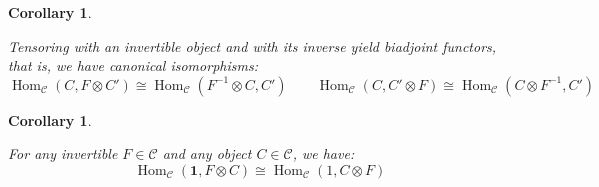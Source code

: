 \documentclass[12pt]{amsart}
\numberwithin{equation}{section}
\newtheorem{proposition}[theorem]{Proposition}
\newtheorem{corollary}[theorem]{Corollary}
\theoremstyle{definition}
\theoremstyle{remark}
\DeclareMathOperator{\Hom}{Hom}
\newcommand{\cat}{\mathcal{C}}
\renewcommand{\1}{\mathbf{1}}
\begin{document}
\begin{corollary}
\label{cor:inv 1}

Tensoring with an invertible object and with its inverse yield biadjoint functors, that is, we have canonical isomorphisms:
$$
\Hom_{\cat}(C, F \otimes C') \cong \Hom_{\cat}(F^{-1} \otimes C,C') \qquad \Hom_{\cat}(C, C' \otimes F) \cong \Hom_{\cat}(C \otimes F^{-1},C')
$$
\end{corollary}

\begin{corollary}
\label{cor:inv 2}

For any invertible $F\in \cat$ and any object $C\in \cat$, we have:
$$
\Hom_{\cat}(\1, F\otimes C) \cong \Hom_{\cat}(1, C \otimes F)
$$
\end{corollary}




\end{document}
